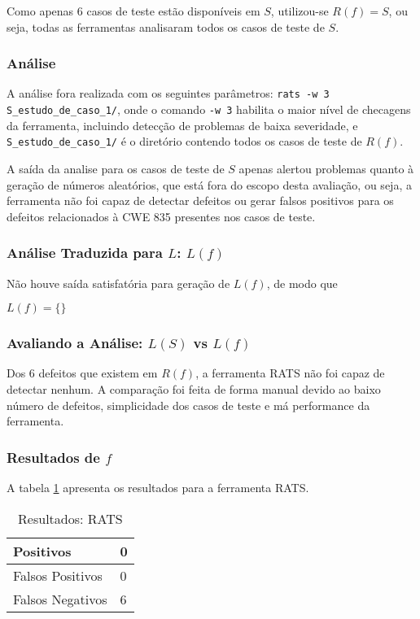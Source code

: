 Como apenas 6 casos de teste estão disponíveis em $S$, utilizou-se $R(f) = S$, ou seja, todas as ferramentas analisaram todos os casos de teste de $S$.

\subsubsection{Análise}

A análise fora realizada com os seguintes parâmetros:
\lstinline{rats -w 3 S_estudo_de_caso_1/},
onde o comando \lstinline{-w 3} habilita o maior nível de checagens da ferramenta, incluindo detecção de problemas de baixa severidade, e \lstinline{S_estudo_de_caso_1/} é o diretório contendo todos os casos de teste de $R(f)$.

A saída da analise para os casos de teste de $S$ apenas alertou problemas quanto à geração de números aleatórios, que está fora do escopo desta avaliação, ou seja, a ferramenta não foi capaz de detectar defeitos ou gerar falsos positivos para os defeitos relacionados à CWE 835 presentes nos casos de teste.

\subsubsection{Análise Traduzida para $L$: $L(f)$}

Não houve saída satisfatória para geração de $L(f)$, de modo que 

$L(f) = \lbrace\rbrace$

\subsubsection{Avaliando a Análise: $L(S)$ vs $L(f)$}

Dos 6 defeitos que existem em $R(f)$, a ferramenta RATS não foi capaz de detectar nenhum. A comparação foi feita de forma manual devido ao baixo número de defeitos, simplicidade dos casos de teste e má performance da ferramenta.

\subsubsection{Resultados de $f$}

A tabela \ref{tabela_rats} apresenta os resultados para a ferramenta RATS.
\begin{table}[h]
  \centering
\begin{tabular}{| l | l |}
  \hline
  Positivos & 0 \\ \hline
  Falsos Positivos & 0 \\ \hline
  Falsos Negativos & 6 \\
  \hline
\end{tabular}
\caption{Resultados: RATS}
\label{tabela_rats}
\end{table}

